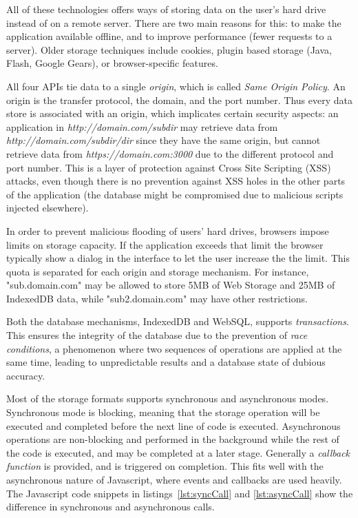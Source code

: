All of these technologies offers ways of storing data on the user's hard drive instead of on a remote server. There are two main reasons for this: to make the application available offline, and to improve performance (fewer requests to a server). Older storage techniques include cookies, plugin based storage (Java, Flash, Google Gears), or browser-specific features.

All four APIs tie data to a single \emph{origin}, which is called \emph{Same Origin Policy}. An origin is the transfer protocol, the domain, and the port number. Thus every data store is associated with an origin, which implicates certain security aspects: an application in \emph{http://domain.com/subdir} may retrieve data from \emph{http://domain.com/subdir/dir} since they have the same origin, but cannot retrieve data from \emph{https://domain.com:3000} due to the different protocol and port number. This is a layer of protection against Cross Site Scripting (XSS) attacks, even though there is no prevention against XSS holes in the other parts of the application (the database might be compromised due to malicious scripts injected elsewhere).

In order to prevent malicious flooding of users' hard drives, browsers impose limits on storage capacity. If the application exceeds that limit the browser typically show a dialog in the interface to let the user increase the the limit. This quota is separated for each origin and storage mechanism. For instance, "sub.domain.com" may be allowed to store 5MB of Web Storage and 25MB of IndexedDB data, while "sub2.domain.com" may have other restrictions.

Both the database mechanisms, IndexedDB and WebSQL, supports \emph{transactions}. This ensures the integrity of the database due to the prevention of \emph{race conditions}, a phenomenon where two sequences of operations are applied at the same time, leading to unpredictable results and a database state of dubious accuracy.

Most of the storage formats supports synchronous and asynchronous modes. Synchronous mode is blocking, meaning that the storage operation will be executed and completed before the next line of code is executed. Asynchronous operations are non-blocking and performed in the background while the rest of the code is executed, and may be completed at a later stage. Generally a \emph{callback function} is provided, and is triggered on completion. This fits well with the asynchronous nature of Javascript, where events and callbacks are used heavily. The Javascript code snippets in listings~\ref{lst:syncCall} and \ref{lst:asyncCall} show the difference in synchronous and asynchronous calls.

